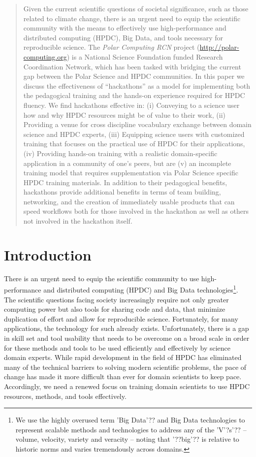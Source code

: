 \documentclass[conference]{IEEEtran}
\begin{document}
\begin{abstract}
Given the current scientific questions of societal significance, such as those related to climate change, there is an urgent need to equip the scientific community with the means to effectively use high-performance and distributed computing (HPDC), Big Data, and tools necessary for reproducible science.  The {\it Polar Computing RCN} project (\url{http://polar-computing.org}) is a National Science Foundation funded Research Coordination Network, which has been tasked with bridging the current gap between the Polar Science and HPDC communities. In this paper we discuss the effectiveness of ``hackathons'' as a model for implementing both the pedagogical training and the hands-on experience required for HPDC fluency.  We find hackathons effective in: (i) Conveying to a science user how and why HPDC resources might be of value to their work, (ii) Providing a venue for cross discipline vocabulary exchange between domain science and HPDC experts, (iii) Equipping science users with customized training that focuses on the practical use of HPDC for their applications, (iv) Providing hands-on training with a realistic domain-specific application in a community of one's peers, but are (v) an incomplete training model that requires supplementation via Polar Science specific HPDC training materials. In addition to their pedagogical benefits, hackathons provide additional benefits in terms of team building, networking, and the creation of immediately usable products that can speed workflows both for those involved in the hackathon as well as others not involved in the hackathon itself. 
\end{abstract}


\section{Introduction}
There is an urgent need to equip the scientific community to use high-performance and distributed computing (HPDC) and Big Data technologies\footnote{ We use the highly overused term 'Big Data'?? and Big Data technologies to represent scalable methods and technologies to address any of the 'V'?s'??  -- volume, velocity, variety and veracity -- noting that '??big'?? is relative to historic norms and varies tremendously across domains.}. The scientific questions facing society increasingly require not only greater computing power but also tools for sharing code and data, that minimize duplication of effort and allow for reproducible science. Fortunately, for many applications, the technology for such already exists. Unfortunately, there is a gap in skill set and tool usability that needs to be overcome on a broad scale in order for these methods and tools to be used efficiently and effectively by science domain experts. While rapid development in the field of HPDC has eliminated many of the technical barriers to solving modern scientific problems, the pace of change has made it more difficult than ever for domain scientists to keep pace. Accordingly, we need a renewed focus on training domain scientists to use HPDC resources, methods, and tools effectively. 
\end{document}
